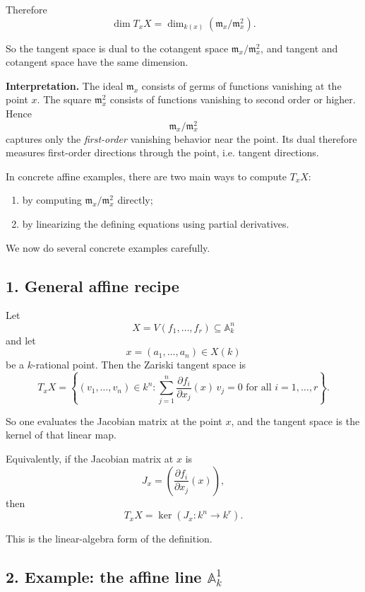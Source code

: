 \documentclass[12pt,a4paper]{article}
\theoremstyle{plain}
\theoremstyle{definition}      %
\begin{document}
	Therefore
	\[
	\dim T_xX=\dim_{k(x)}(\mathfrak m_x/\mathfrak m_x^2).
	\]
	
	So the tangent space is dual to the cotangent space \(\mathfrak m_x/\mathfrak m_x^2\), and tangent and cotangent space have the same dimension.
	
	\bigskip
	
	\textbf{Interpretation.}
	The ideal \(\mathfrak m_x\) consists of germs of functions vanishing at the point \(x\). The square \(\mathfrak m_x^2\) consists of functions vanishing to second order or higher. Hence
	\[
	\mathfrak m_x/\mathfrak m_x^2
	\]
	captures only the \emph{first-order} vanishing behavior near the point. Its dual therefore measures first-order directions through the point, i.e. tangent directions.
	
	\bigskip
	
	In concrete affine examples, there are two main ways to compute \(T_xX\):
	
	\begin{enumerate}
		\item by computing \(\mathfrak m_x/\mathfrak m_x^2\) directly;
		\item by linearizing the defining equations using partial derivatives.
	\end{enumerate}
	
	We now do several concrete examples carefully.
	
	\subsection*{1. General affine recipe}
	
	Let
	\[
	X=V(f_1,\dots,f_r)\subseteq \mathbb A_k^n
	\]
	and let
	\[
	x=(a_1,\dots,a_n)\in X(k)
	\]
	be a \(k\)-rational point. Then the Zariski tangent space is
	\[
	T_xX
	=
	\left\{
	(v_1,\dots,v_n)\in k^n:
	\sum_{j=1}^n
	\frac{\partial f_i}{\partial x_j}(x)\,v_j=0
	\text{ for all }i=1,\dots,r
	\right\}.
	\]
	
	So one evaluates the Jacobian matrix at the point \(x\), and the tangent space is the kernel of that linear map.
	
	Equivalently, if the Jacobian matrix at \(x\) is
	\[
	J_x=
	\left(
	\frac{\partial f_i}{\partial x_j}(x)
	\right),
	\]
	then
	\[
	T_xX=\ker(J_x:k^n\to k^r).
	\]
	
	This is the linear-algebra form of the definition.
	
	\subsection*{2. Example: the affine line \(\mathbb A^1_k\)}
	
\end{document}
